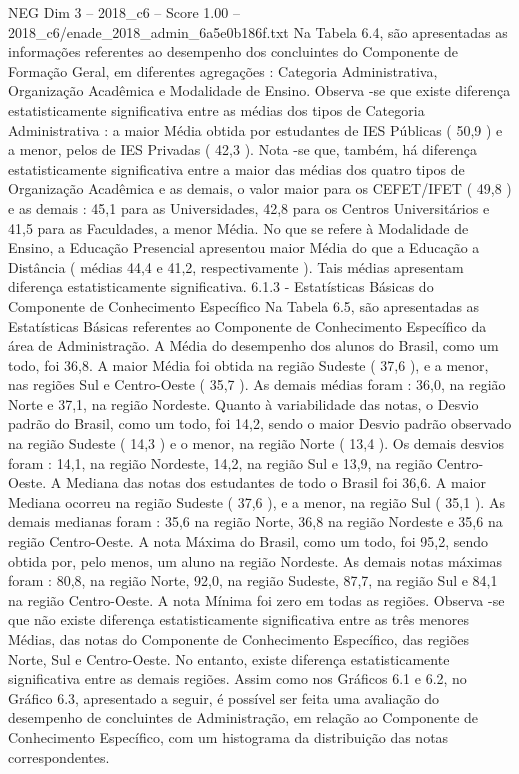 \begin{textsample}{NEG Dim 3 – 2018\_c6 – Score 1.00 – 2018\_c6/enade\_2018\_admin\_6a5e0b186f.txt}
Na Tabela 6.4, são apresentadas as informações referentes ao desempenho dos concluintes do Componente de Formação Geral, em diferentes agregações : Categoria Administrativa, Organização Acadêmica e Modalidade de Ensino.
Observa -se que existe diferença estatisticamente significativa entre as médias dos tipos de Categoria Administrativa : a maior Média obtida por estudantes de IES Públicas ( 50,9 ) e a menor, pelos de IES Privadas ( 42,3 ).
Nota -se que, também, há diferença estatisticamente significativa entre a maior das médias dos quatro tipos de Organização Acadêmica e as demais, o valor maior para os CEFET/IFET ( 49,8 ) e as demais : 45,1 para as Universidades, 42,8 para os Centros Universitários e 41,5 para as Faculdades, a menor Média.
No que se refere à Modalidade de Ensino, a Educação Presencial apresentou maior Média do que a Educação a Distância ( médias 44,4 e 41,2, respectivamente ).
Tais médias apresentam diferença estatisticamente significativa. 6.1.3 - Estatísticas Básicas do Componente de Conhecimento Específico Na Tabela 6.5, são apresentadas as Estatísticas Básicas referentes ao Componente de Conhecimento Específico da área de Administração.
A Média do desempenho dos alunos do Brasil, como um todo, foi 36,8.
A maior Média foi obtida na região Sudeste ( 37,6 ), e a menor, nas regiões Sul e Centro-Oeste ( 35,7 ).
As demais médias foram : 36,0, na região Norte e 37,1, na região Nordeste.
Quanto à variabilidade das notas, o Desvio padrão do Brasil, como um todo, foi 14,2, sendo o maior Desvio padrão observado na região Sudeste ( 14,3 ) e o menor, na região Norte ( 13,4 ).
Os demais desvios foram : 14,1, na região Nordeste, 14,2, na região Sul e 13,9, na região Centro-Oeste.
A Mediana das notas dos estudantes de todo o Brasil foi 36,6.
A maior Mediana ocorreu na região Sudeste ( 37,6 ), e a menor, na região Sul ( 35,1 ).
As demais medianas foram : 35,6 na região Norte, 36,8 na região Nordeste e 35,6 na região Centro-Oeste.
A nota Máxima do Brasil, como um todo, foi 95,2, sendo obtida por, pelo menos, um aluno na região Nordeste.
As demais notas máximas foram : 80,8, na região Norte, 92,0, na região Sudeste, 87,7, na região Sul e 84,1 na região Centro-Oeste.
A nota Mínima foi zero em todas as regiões.
Observa -se que não existe diferença estatisticamente significativa entre as três menores Médias, das notas do Componente de Conhecimento Específico, das regiões Norte, Sul e Centro-Oeste.
No entanto, existe diferença estatisticamente significativa entre as demais regiões.
Assim como nos Gráficos 6.1 e 6.2, no Gráfico 6.3, apresentado a seguir, é possível ser feita uma avaliação do desempenho de concluintes de Administração, em relação ao Componente de Conhecimento Específico, com um histograma da distribuição das notas correspondentes.

\end{textsample}
